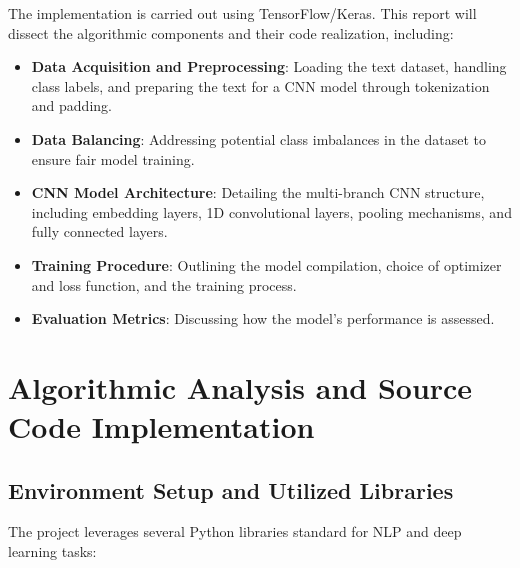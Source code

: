 \documentclass[twocolumn]{article}
\begin{document}
The implementation is carried out using TensorFlow/Keras. This report will dissect the algorithmic components and their code realization, including:
\begin{itemize}
    \item \textbf{Data Acquisition and Preprocessing}: Loading the text dataset, handling class labels, and preparing the text for a CNN model through tokenization and padding.
    \item \textbf{Data Balancing}: Addressing potential class imbalances in the dataset to ensure fair model training.
    \item \textbf{CNN Model Architecture}: Detailing the multi-branch CNN structure, including embedding layers, 1D convolutional layers, pooling mechanisms, and fully connected layers.
    \item \textbf{Training Procedure}: Outlining the model compilation, choice of optimizer and loss function, and the training process.
    \item \textbf{Evaluation Metrics}: Discussing how the model's performance is assessed.
\end{itemize}

\section{Algorithmic Analysis and Source Code Implementation}

\subsection{Environment Setup and Utilized Libraries}

The project leverages several Python libraries standard for NLP and deep learning tasks:
\end{document}
